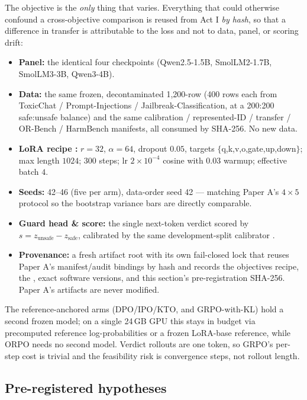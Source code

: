 The objective is the \emph{only} thing that varies. Everything that could otherwise confound a
cross-objective comparison is reused from Act I \emph{by hash}, so that a difference in transfer is
attributable to the loss and not to data, panel, or scoring drift:
\begin{itemize}[leftmargin=1.4em,itemsep=1pt]
  \item \textbf{Panel:} the identical four checkpoints (Qwen2.5-1.5B, SmolLM2-1.7B, SmolLM3-3B, Qwen3-4B).
  \item \textbf{Data:} the same frozen, decontaminated 1{,}200-row  (400 rows each from
  ToxicChat / Prompt-Injections / Jailbreak-Classification, at a 200:200 safe:unsafe balance) and the same
  calibration / represented-ID / transfer / OR-Bench / HarmBench manifests, all consumed by SHA-256. No new
  data.
  \item \textbf{LoRA recipe \citep{hu2021lora}:} $r{=}32$, $\alpha{=}64$, dropout $0.05$, targets
  $\{$q,k,v,o,gate,up,down$\}$; max length $1024$; $300$ steps; lr $2\!\times\!10^{-4}$ cosine with $0.03$
  warmup; effective batch $4$.
  \item \textbf{Seeds:} 42--46 (five per arm), data-order seed 42 --- matching Paper A's $4\times5$ protocol
  so the bootstrap variance bars are directly comparable.
  \item \textbf{Guard head \& score:} the single next-token verdict scored by
  $s=z_{\text{unsafe}}-z_{\text{safe}}$, calibrated by the same development-split calibrator
  \citep{guo2017calibration}.
  \item \textbf{Provenance:} a fresh artifact root  with its own
  fail-closed lock that reuses Paper A's manifest/audit bindings by hash and records the objectives recipe,
  the , exact software versions, and this section's pre-registration
  SHA-256. Paper A's artifacts are never modified.
\end{itemize}
The reference-anchored arms (DPO/IPO/KTO, and GRPO-with-KL) hold a second frozen model; on a single 24\,GB
GPU this stays in budget via precomputed reference log-probabilities or a frozen LoRA-base reference, while
ORPO needs no second model. Verdict rollouts are one token, so GRPO's per-step cost is trivial and the
feasibility risk is convergence steps, not rollout length.

\subsection{Pre-registered hypotheses}
\label{sec:actII-hyp}

